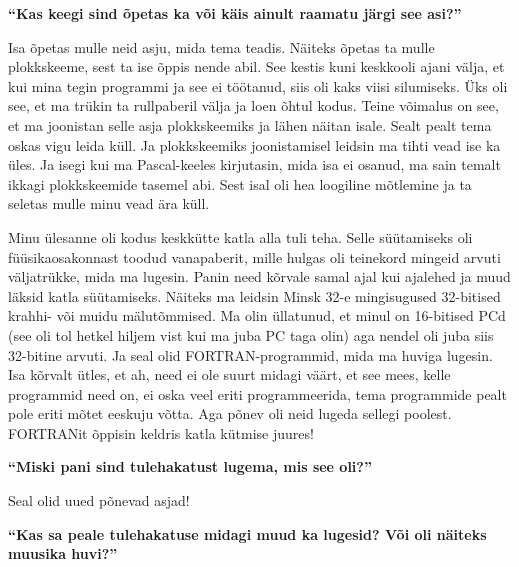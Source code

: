 \textbf{\enquote{Kas keegi sind õpetas ka või käis ainult raamatu järgi see asi?}}

Isa õpetas mulle neid asju, mida tema teadis. Näiteks õpetas ta mulle plokkskeeme, sest ta ise õppis nende abil. See kestis kuni keskkooli ajani välja, et kui mina tegin programmi ja see ei töötanud, siis oli kaks viisi silumiseks. Üks oli see, et ma trükin ta rullpaberil välja ja loen õhtul kodus. Teine võimalus on see, et ma joonistan selle asja plokkskeemiks ja lähen näitan isale. Sealt pealt tema oskas vigu leida küll. Ja plokkskeemiks joonistamisel leidsin ma tihti vead ise ka üles. Ja isegi kui ma Pascal-keeles kirjutasin, mida isa ei osanud, ma sain temalt ikkagi plokkskeemide tasemel abi. Sest isal oli hea loogiline mõtlemine ja ta seletas mulle minu vead ära küll. 

Minu ülesanne oli kodus keskkütte katla alla tuli teha. Selle süütamiseks oli füüsikaosakonnast toodud vanapaberit, mille hulgas oli teinekord mingeid arvuti väljatrükke, mida ma lugesin. Panin need kõrvale samal ajal kui ajalehed ja muud läksid katla süütamiseks. Näiteks ma leidsin Minsk 32-e mingisugused 32-bitised krahhi- või muidu mälutõmmised. Ma olin üllatunud, et minul on 16-bitised PCd (see oli tol hetkel hiljem vist kui ma juba PC taga olin) aga nendel oli juba siis 32-bitine arvuti. Ja seal olid FORTRAN-programmid, mida ma huviga lugesin. Isa kõrvalt ütles, et ah, need ei ole suurt midagi väärt, et see mees, kelle programmid need on, ei oska veel eriti programmeerida, tema programmide pealt pole eriti mõtet eeskuju võtta. Aga põnev oli neid lugeda sellegi poolest. FORTRANit õppisin keldris katla kütmise juures!

\textbf{\enquote{Miski pani sind tulehakatust lugema, mis see oli?}}

Seal olid uued põnevad asjad!

\textbf{\enquote{Kas sa peale tulehakatuse midagi muud ka lugesid? Või oli näiteks muusika huvi?}}

